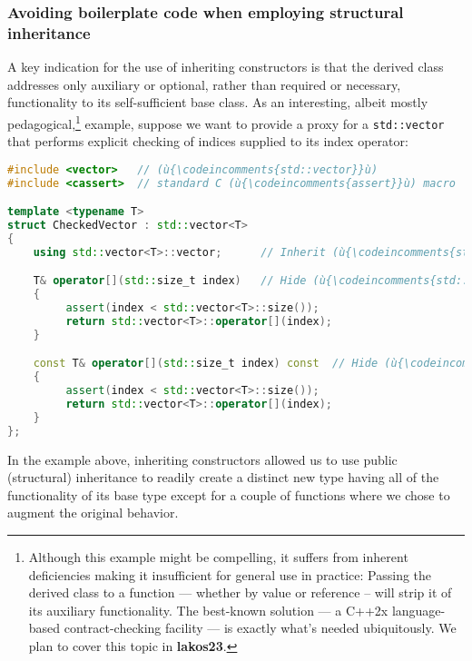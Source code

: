 \subsubsection[Avoiding boilerplate code when employing structural inheritance]{Avoiding boilerplate code when employing structural inheritance}\label{avoiding-boilerplate-code-code-when-employing-structural-inheritance}

A key indication for the use of inheriting constructors is that the
derived class addresses only auxiliary or optional, rather than required
or necessary, functionality to its self-sufficient base class. As an
interesting, albeit mostly pedagogical,{\cprotect\footnote{Although this
example might be compelling, it suffers from inherent deficiencies
making it insufficient for general use in practice: Passing the
derived class to a function --- whether by value or reference -- will
strip it of its auxiliary functionality. The best-known solution --- a
C++2x language-based contract-checking facility --- is exactly what's
  needed ubiquitously. We plan to cover this topic in \textbf{lakos23}.}} example, suppose we
want to provide a proxy for a \texttt{std::vector} that performs
explicit checking of indices supplied to its index operator:

\begin{lstlisting}[language=C++]
#include <vector>   // (ù{\codeincomments{std::vector}}ù)
#include <cassert>  // standard C (ù{\codeincomments{assert}}ù) macro

template <typename T>
struct CheckedVector : std::vector<T>
{
    using std::vector<T>::vector;      // Inherit (ù{\codeincomments{std::vector}}ù)'s constructors.

    T& operator[](std::size_t index)   // Hide (ù{\codeincomments{std::vector}}ù)'s index operator.
    {
         assert(index < std::vector<T>::size());
         return std::vector<T>::operator[](index);
    }

    const T& operator[](std::size_t index) const  // Hide (ù{\codeincomments{const}}ù) index operator.
    {
         assert(index < std::vector<T>::size());
         return std::vector<T>::operator[](index);
    }
};
\end{lstlisting}

\noindent In the example above, inheriting constructors allowed us to use public
(structural) inheritance to readily create a distinct new type having
all of the functionality of its base type except for a couple of
functions where we chose to augment the original behavior.

